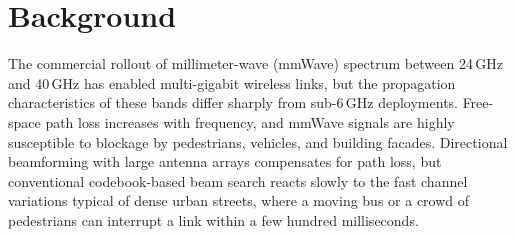 \section{Background}
The commercial rollout of millimeter-wave (mmWave) spectrum between 24\,GHz
and 40\,GHz has enabled multi-gigabit wireless links, but the propagation
characteristics of these bands differ sharply from sub-6\,GHz deployments.
Free-space path loss increases with frequency, and mmWave signals are highly
susceptible to blockage by pedestrians, vehicles, and building facades.
Directional beamforming with large antenna arrays compensates for path loss,
but conventional codebook-based beam search reacts slowly to the fast channel
variations typical of dense urban streets, where a moving bus or a crowd of
pedestrians can interrupt a link within a few hundred milliseconds.
